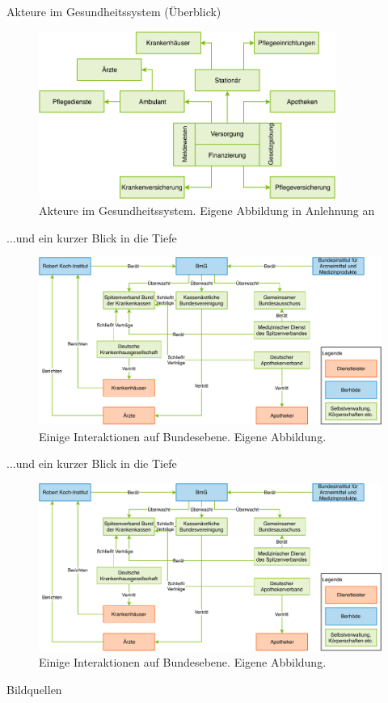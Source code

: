 \documentclass[aspectratio=169,t]{beamer}
\begin{document}
\begin{frame}{Akteure im Gesundheitssystem (Überblick)}
   \begin{figure}[h!]
    \includegraphics[height=5.5cm]{Bilder/Gesundheitssystem.pdf}
     \caption{Akteure im Gesundheitssystem. Eigene Abbildung in Anlehnung an \cite{SmartHealth}}
   \end{figure}
\end{frame}

\begin{frame}{...und ein kurzer Blick in die Tiefe}
   \begin{figure}[h!]
    \includegraphics[height=5.5cm]{Bilder/GesundheitssystemAkteureBund.pdf}
     \caption{Einige Interaktionen auf Bundesebene. Eigene Abbildung.}
   \end{figure}
\end{frame}

\begin{frame}{...und ein kurzer Blick in die Tiefe}
   \begin{figure}[h!]
    \includegraphics[height=5.5cm]{Bilder/GesundheitssystemAkteureBund.pdf}
     \caption{Einige Interaktionen auf Bundesebene. Eigene Abbildung.}
   \end{figure}
\end{frame}


\begin{frame}{Bildquellen}
\printbibliography
\end{frame}
\end{document}
